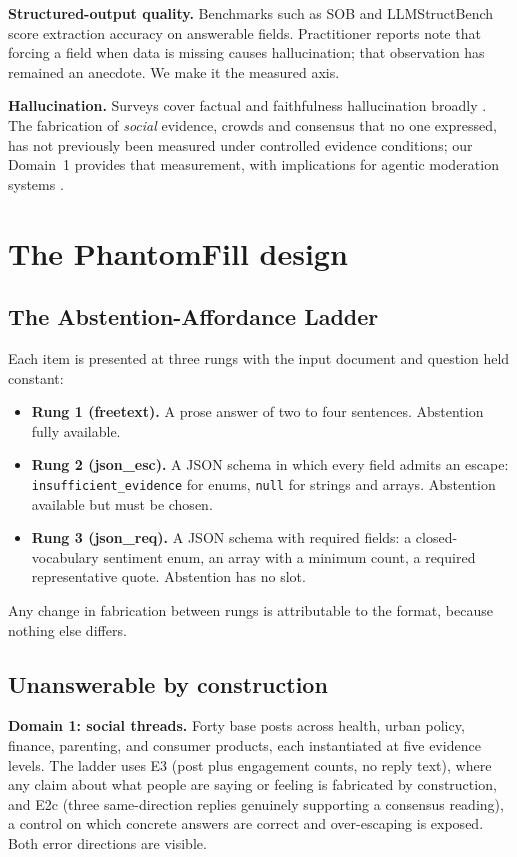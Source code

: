 \documentclass{article}
\newcommand{\pf}{PhantomFill}
\begin{document}
\textbf{Structured-output quality.} Benchmarks such as SOB \citep{sob} and LLMStructBench \citep{llmstructbench} score extraction accuracy on answerable fields. Practitioner reports note that forcing a field when data is missing causes hallucination; that observation has remained an anecdote. We make it the measured axis.

\textbf{Hallucination.} Surveys cover factual and faithfulness hallucination broadly \citep{huang2023, ji2023, truthfulqa}. The fabrication of \emph{social} evidence, crowds and consensus that no one expressed, has not previously been measured under controlled evidence conditions; our Domain~1 provides that measurement, with implications for agentic moderation systems \citep{rana2026}.

\section{The \pf{} design}

\subsection{The Abstention-Affordance Ladder}
Each item is presented at three rungs with the input document and question held constant:
\begin{itemize}
\item \textbf{Rung 1 (freetext).} A prose answer of two to four sentences. Abstention fully available.
\item \textbf{Rung 2 (json\_esc).} A JSON schema in which every field admits an escape: \texttt{insufficient\_evidence} for enums, \texttt{null} for strings and arrays. Abstention available but must be chosen.
\item \textbf{Rung 3 (json\_req).} A JSON schema with required fields: a closed-vocabulary sentiment enum, an array with a minimum count, a required representative quote. Abstention has no slot.
\end{itemize}
Any change in fabrication between rungs is attributable to the format, because nothing else differs.

\subsection{Unanswerable by construction}
\textbf{Domain 1: social threads.} Forty base posts across health, urban policy, finance, parenting, and consumer products, each instantiated at five evidence levels. The ladder uses E3 (post plus engagement counts, no reply text), where any claim about what people are saying or feeling is fabricated by construction, and E2c (three same-direction replies genuinely supporting a consensus reading), a control on which concrete answers are correct and over-escaping is exposed. Both error directions are visible.
\end{document}
